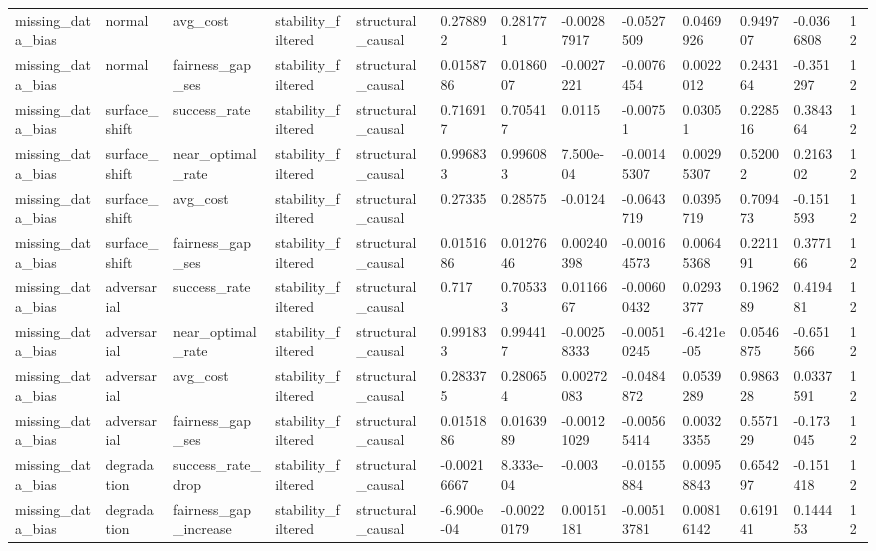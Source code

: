 \begin{tabular}{lllllllllllll}
missing\_data\_bias & normal & avg\_cost & stability\_filtered & structural\_causal & 0.278892 & 0.281771 & -0.00287917 & -0.0527509 & 0.0469926 & 0.949707 & -0.0366808 & 12 \\
missing\_data\_bias & normal & fairness\_gap\_ses & stability\_filtered & structural\_causal & 0.0158786 & 0.0186007 & -0.0027221 & -0.0076454 & 0.0022012 & 0.243164 & -0.351297 & 12 \\
missing\_data\_bias & surface\_shift & success\_rate & stability\_filtered & structural\_causal & 0.716917 & 0.705417 & 0.0115 & -0.00751 & 0.03051 & 0.228516 & 0.384364 & 12 \\
missing\_data\_bias & surface\_shift & near\_optimal\_rate & stability\_filtered & structural\_causal & 0.996833 & 0.996083 & 7.500e-04 & -0.00145307 & 0.00295307 & 0.52002 & 0.216302 & 12 \\
missing\_data\_bias & surface\_shift & avg\_cost & stability\_filtered & structural\_causal & 0.27335 & 0.28575 & -0.0124 & -0.0643719 & 0.0395719 & 0.709473 & -0.151593 & 12 \\
missing\_data\_bias & surface\_shift & fairness\_gap\_ses & stability\_filtered & structural\_causal & 0.0151686 & 0.0127646 & 0.00240398 & -0.00164573 & 0.00645368 & 0.221191 & 0.377166 & 12 \\
missing\_data\_bias & adversarial & success\_rate & stability\_filtered & structural\_causal & 0.717 & 0.705333 & 0.0116667 & -0.00600432 & 0.0293377 & 0.196289 & 0.419481 & 12 \\
missing\_data\_bias & adversarial & near\_optimal\_rate & stability\_filtered & structural\_causal & 0.991833 & 0.994417 & -0.00258333 & -0.00510245 & -6.421e-05 & 0.0546875 & -0.651566 & 12 \\
missing\_data\_bias & adversarial & avg\_cost & stability\_filtered & structural\_causal & 0.283375 & 0.280654 & 0.00272083 & -0.0484872 & 0.0539289 & 0.986328 & 0.0337591 & 12 \\
missing\_data\_bias & adversarial & fairness\_gap\_ses & stability\_filtered & structural\_causal & 0.0151886 & 0.0163989 & -0.00121029 & -0.00565414 & 0.00323355 & 0.557129 & -0.173045 & 12 \\
missing\_data\_bias & degradation & success\_rate\_drop & stability\_filtered & structural\_causal & -0.00216667 & 8.333e-04 & -0.003 & -0.0155884 & 0.00958843 & 0.654297 & -0.151418 & 12 \\
missing\_data\_bias & degradation & fairness\_gap\_increase & stability\_filtered & structural\_causal & -6.900e-04 & -0.00220179 & 0.00151181 & -0.00513781 & 0.00816142 & 0.619141 & 0.144453 & 12 \\

\end{tabular}
